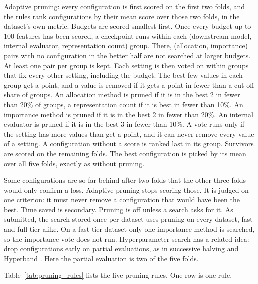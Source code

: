 Adaptive pruning: every configuration is first scored on the first two folds, and the rules rank configurations by their mean score over those two folds, in the dataset's own metric. Budgets are scored smallest first. Once every budget up to 100 features has been scored, a checkpoint runs within each (downstream model, internal evaluator, representation count) group. There, (allocation, importance) pairs with no configuration in the better half are not searched at larger budgets. At least one pair per group is kept. Each setting is then voted on within groups that fix every other setting, including the budget. The best few values in each group get a point, and a value is removed if it gets a point in fewer than a cut-off share of groups. An allocation method is pruned if it is in the best 2 in fewer than 20\% of groups, a representation count if it is best in fewer than 10\%. An importance method is pruned if it is in the best 2 in fewer than 20\%. An internal evaluator is pruned if it is in the best 3 in fewer than 10\%. A vote runs only if the setting has more values than get a point, and it can never remove every value of a setting. A configuration without a score is ranked last in its group. Survivors are scored on the remaining folds. The best configuration is picked by its mean over all five folds, exactly as without pruning.

Some configurations are so far behind after two folds that the other three folds would only confirm a loss. Adaptive pruning stops scoring those. It is judged on one criterion: it must never remove a configuration that would have been the best. Time saved is secondary. Pruning is off unless a search asks for it. As submitted, the search stored once per dataset uses pruning on every dataset, fast and full tier alike. On a fast-tier dataset only one importance method is searched, so the importance vote does not run. Hyperparameter search has a related idea: drop configurations early on partial evaluations, as in successive halving \citep{Jamieson2016} and Hyperband \citep{Li2018Hyperband}. Here the partial evaluation is two of the five folds.

Table~\ref{tab:pruning_rules} lists the five pruning rules. One row is one rule.

